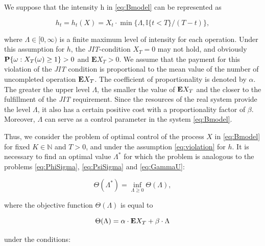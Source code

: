 	We suppose that the intensity h in \eqref{eq:Bmodel} can be represented as

\begin{equation}\label{eq:violation}

h_t = {h_t}(X) = {X_t}\cdot \min\{\Lambda, \mathbb{I}\{t<T\} / (T- t) \},

\end{equation}

where $\Lambda \in [0, \infty)$ is a finite maximum level of intensity for each operation. Under this assumption for $h$, the \emph{JIT}-condition $X_T = 0$ may not hold, and obviously ${\textbf P}\{\omega: {X_T}(\omega) \geq 1\}> 0$ and $\textbf{E}X_T>0$. We assume that the payment for this violation of the \emph{JIT} condition is proportional to the mean value of the number of uncompleted operation ${\textbf E}X_T$. The coefficient of proportionality is denoted by $\alpha$. The greater the upper level $\Lambda$, the smaller the value of  ${\textbf E}X_T$ and the closer to the fulfillment of the \emph{JIT} requirement. Since the resources of the real system provide the level $\Lambda$, it also has a certain positive cost with a proportionality factor of $\beta$. Moreover, $\Lambda$ can serve as a control parameter in the system \eqref{eq:Bmodel}.



	Thus, we consider the problem of optimal control of the process $X$ in \eqref{eq:Bmodel} for fixed $K \in \mathbb{N}$ and $T>0$, and under the assumption \eqref{eq:violation} for $h$. It is necessary to find an optimal value $\Lambda^*$ for which the problem is analogous to the problems  \eqref{eq:PhiSigma}, \eqref{eq:PsiSigma} and \eqref{eq:GammaU}:


\begin{equation}\label{eq:ThetaOptimal}

	\Theta ({\Lambda}^*) = \inf_{\Lambda \geq 0}\Theta (\Lambda),

\end{equation}

where the objective function $\Theta (\Lambda)$ is equal to	

\begin{equation}\label{eq:ThetaL}

	\Theta (\Lambda) = \alpha \cdot{\textbf E}X_T + \beta \cdot \Lambda

\end{equation}

under the conditions:

